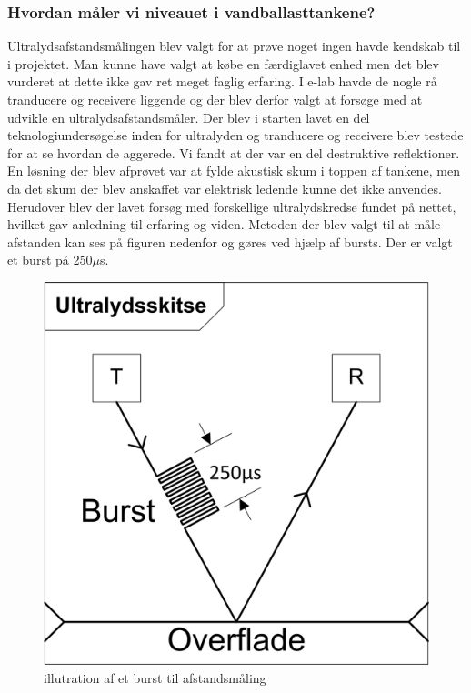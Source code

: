\subsubsection{Hvordan måler vi niveauet i vandballasttankene?}
Ultralydsafstandsmålingen blev valgt for at prøve noget ingen havde kendskab til i projektet. Man kunne have valgt at købe en færdiglavet enhed men det blev vurderet at dette ikke gav ret meget faglig erfaring. I e-lab havde de nogle rå tranducere og receivere liggende og der blev derfor valgt at forsøge med at udvikle en ultralydsafstandsmåler. Der blev i starten lavet en del teknologiundersøgelse inden for ultralyden og tranducere og receivere blev testede for at se hvordan de aggerede. Vi fandt at der var en del destruktive reflektioner. En løsning der blev afprøvet var at fylde akustisk skum i toppen af tankene, men da det skum der blev anskaffet var elektrisk ledende kunne det ikke anvendes. Herudover blev der lavet forsøg med forskellige ultralydskredse fundet på nettet, hvilket gav anledning til erfaring og viden. Metoden der blev valgt til at måle afstanden kan ses på figuren nedenfor og gøres ved hjælp af bursts. Der er valgt et burst på 250$\mu$s.
\begin{figure}[H]
\centering
\includegraphics[width=.4\textwidth]{billeder/ultralydsburst}
\caption{illutration af et burst til afstandsmåling}
\end{figure}

